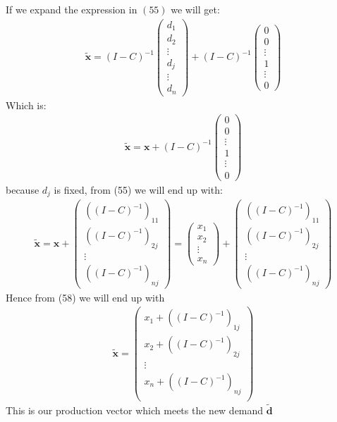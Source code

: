 \documentclass[12pt]{article}
\begin{document}
\newpage
If we expand the expression in $(55)$ we will get:
\begin{align}
\bm{\tilde{x}}=(I-C)^{-1}\left(\begin{array}{c}
d_1\\
d_2\\
\vdots \\
d_j \\ 
\vdots \\
d_n
\end{array}\right)+(I-C)^{-1}
\left(\begin{array}{c}
0 \\
0 \\
\vdots \\
1 \\ 
\vdots \\0
\end{array}\right)
\end{align}
Which is: 
\begin{align}
\bm{\tilde{x}}=\textbf{x}
+(I-C)^{-1}
\left(\begin{array}{c}
0 \\
0 \\
\vdots \\
1 \\ 
\vdots \\
0
\end{array}\right)
\end{align}
because $d_j$ is fixed, from (55) we will end up with:
\begin{align}
\bm{\tilde{x}}=\textbf{x}
+
\left(\begin{array}{c}
((I-C)^{-1})_{11} \\
((I-C)^{-1})_{2j} \\
\vdots \\
((I-C)^{-1})_{nj}
\end{array}\right)
=
\left(\begin{array}{c}
x_1\\
x_2\\
\vdots \\
x_n
\end{array}\right)
+
\left(\begin{array}{c}
((I-C)^{-1})_{11} \\
((I-C)^{-1})_{2j} \\
\vdots \\
((I-C)^{-1})_{nj}
\end{array}\right)
\end{align}
Hence from (58) we will end up with
\begin{align}
\bm{\tilde{x}}=
\left(\begin{array}{c}
x_1+((I-C)^{-1})_{1j} \\
x_2+((I-C)^{-1})_{2j} \\
\vdots \\
x_n+((I-C)^{-1})_{nj} \\
\end{array}\right)
\end{align}
This is our production vector which meets the new demand $\bm{\tilde{d}}$
\newpage
\end{document}
